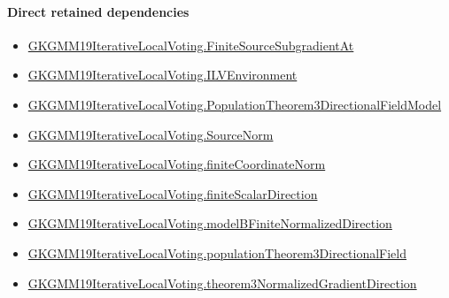 \documentclass[10pt]{article}
\begin{document}
\paragraph{Direct retained dependencies}
\begin{itemize}\raggedright
\item \hyperlink{governing-declaration-b2fa0681d239fd2f}{GKGMM19\allowbreak{}Iterative\allowbreak{}Local\allowbreak{}Voting.\allowbreak{}Finite\allowbreak{}Source\allowbreak{}Subgradient\allowbreak{}At}
\item \hyperlink{governing-declaration-df2ca62df1846667}{GKGMM19\allowbreak{}Iterative\allowbreak{}Local\allowbreak{}Voting.\allowbreak{}ILV\allowbreak{}Environment}
\item \hyperlink{governing-declaration-30327078fcfa0789}{GKGMM19\allowbreak{}Iterative\allowbreak{}Local\allowbreak{}Voting.\allowbreak{}Population\allowbreak{}Theorem3\allowbreak{}Directional\allowbreak{}Field\allowbreak{}Model}
\item \hyperlink{governing-declaration-6fa4ab9852321b03}{GKGMM19\allowbreak{}Iterative\allowbreak{}Local\allowbreak{}Voting.\allowbreak{}Source\allowbreak{}Norm}
\item \hyperlink{governing-declaration-6b5981b41f6efa87}{GKGMM19\allowbreak{}Iterative\allowbreak{}Local\allowbreak{}Voting.\allowbreak{}finite\allowbreak{}Coordinate\allowbreak{}Norm}
\item \hyperlink{governing-declaration-f56df981a74d6c99}{GKGMM19\allowbreak{}Iterative\allowbreak{}Local\allowbreak{}Voting.\allowbreak{}finite\allowbreak{}Scalar\allowbreak{}Direction}
\item \hyperlink{governing-declaration-20e8ece513543e43}{GKGMM19\allowbreak{}Iterative\allowbreak{}Local\allowbreak{}Voting.\allowbreak{}model\allowbreak{}B\allowbreak{}Finite\allowbreak{}Normalized\allowbreak{}Direction}
\item \hyperlink{governing-declaration-2aecbc804ca585b9}{GKGMM19\allowbreak{}Iterative\allowbreak{}Local\allowbreak{}Voting.\allowbreak{}population\allowbreak{}Theorem3\allowbreak{}Directional\allowbreak{}Field}
\item \hyperlink{governing-declaration-707c715fce554e50}{GKGMM19\allowbreak{}Iterative\allowbreak{}Local\allowbreak{}Voting.\allowbreak{}theorem3\allowbreak{}Normalized\allowbreak{}Gradient\allowbreak{}Direction}
\end{itemize}
\end{document}

